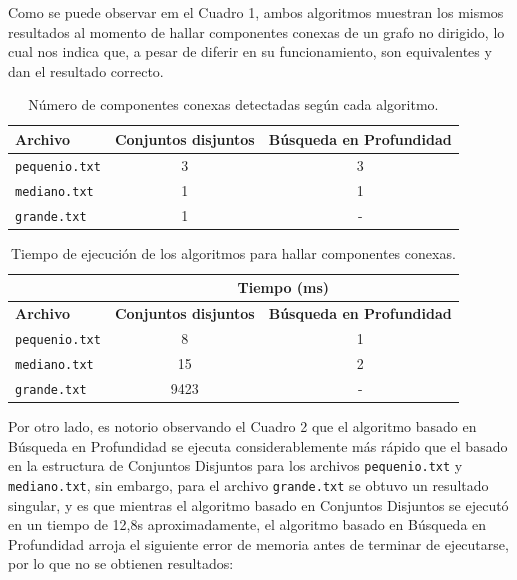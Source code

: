 \documentclass[11pt]{article}
\begin{document}
Como se puede observar em el Cuadro 1, ambos algoritmos muestran los mismos resultados
al momento de hallar componentes conexas de un grafo no dirigido, lo cual 
nos indica que, a pesar de diferir en su funcionamiento, son equivalentes y dan 
el resultado correcto. \\

\newpage

\begin{table}[t]
   \centering
   \begin{tabular}{lcc}
      \hline
      \textbf{Archivo} & \multicolumn{1}{l}{\textbf{Conjuntos disjuntos}} & \multicolumn{1}{l}{\textbf{Búsqueda en Profundidad}} \\ \hline
      \texttt{pequenio.txt} & 3 & 3 \\
      \texttt{mediano.txt} & 1 & 1 \\
      \texttt{grande.txt} & 1 & - \\ \hline
   \end{tabular}
   \label{tab:componentes}
   \caption{Número de componentes conexas detectadas según cada algoritmo.}
   \vspace{-1em}
\end{table}


\begin{table}[t]
   \centering
   \begin{tabular}{lcc}
      \hline
      & \multicolumn{2}{c}{\textbf{Tiempo (ms)}}   \\ \hline
      \textbf{Archivo} & \multicolumn{1}{c}{\textbf{Conjuntos disjuntos}} & \multicolumn{1}{c}{\textbf{Búsqueda en Profundidad}} \\ \hline
      \texttt{pequenio.txt} & 8 & 1 \\
      \texttt{mediano.txt} & 15 & 2 \\
      \texttt{grande.txt} &  9423 & - \\ \hline
   \end{tabular}
   \label{tab:tiemposcc}
   \caption{Tiempo de ejecución de los algoritmos para hallar componentes conexas.}
\end{table}


Por otro lado, es notorio observando el Cuadro 2 que el algoritmo basado en Búsqueda 
en Profundidad se ejecuta considerablemente más rápido que el basado en la
estructura de Conjuntos Disjuntos para los archivos \texttt{pequenio.txt} y
\texttt{mediano.txt}, sin embargo, para el archivo \texttt{grande.txt} se obtuvo
un resultado singular, y es que mientras el algoritmo basado en Conjuntos Disjuntos
se ejecutó en un tiempo de 12,8s aproximadamente, el algoritmo basado en Búsqueda en
Profundidad arroja el siguiente error de memoria antes de terminar de ejecutarse, por lo que 
no se obtienen resultados: \\
\end{document}
